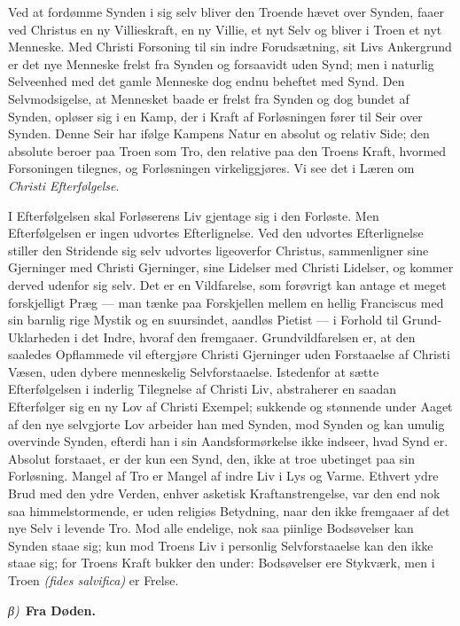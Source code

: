 \documentclass[12pt]{book}
\newcommand{\greekrun}[2]{%
  \medskip\begin{center}{\itshape #1)}\ {\bfseries #2}\end{center}\medskip}
\begin{document}
Ved at fordømme Synden i sig selv bliver den Troende hævet over
Synden, faaer ved Christus en ny Villieskraft, en ny Villie, et nyt
Selv og bliver i Troen et nyt Menneske. Med Christi Forsoning til
sin indre Forudsætning, sit Livs Ankergrund er det nye Menneske
frelst fra Synden og forsaavidt uden Synd; men i naturlig
Selveenhed med det gamle Menneske dog endnu beheftet med Synd. Den
Selvmodsigelse, at Mennesket baade er frelst fra Synden og dog
bundet af Synden, opløser sig i en Kamp, der i Kraft af
Forløsningen fører til Seir over Synden. Denne Seir har ifølge
Kampens Natur en absolut og relativ Side; den absolute beroer paa
Troen som Tro, den relative paa den Troens Kraft, hvormed
Forsoningen tilegnes, og Forløsningen virkeliggjøres. Vi see det i
Læren om \emph{Christi Efterfølgelse}.

I Efterfølgelsen skal Forløserens Liv gjentage sig i den Forløste.
Men Efterfølgelsen er ingen udvortes Efterlignelse. Ved den udvortes
Efterlignelse stiller den Stridende sig selv udvortes ligeoverfor
Christus, sammenligner sine Gjerninger med Christi Gjerninger, sine
Lidelser med Christi Lidelser, og kommer derved udenfor sig selv.
Det er en Vildfarelse, som forøvrigt kan antage et meget
forskjelligt Præg --- man tænke paa Forskjellen mellem en hellig
Franciscus med sin barnlig rige Mystik og en suursindet, aandløs
Pietist --- i Forhold til Grund-Uklarheden i det Indre, hvoraf den
fremgaaer. Grundvildfarelsen er, at den saaledes Opflammede vil
eftergjøre Christi Gjerninger uden Forstaaelse af Christi Væsen,
uden dybere menneskelig Selvforstaaelse. Istedenfor at sætte
Efterfølgelsen i inderlig Tilegnelse af Christi Liv, abstraherer en
saadan Efterfølger sig en ny Lov af Christi
Exempel; sukkende og stønnende under Aaget af den nye selvgjorte Lov
arbeider han med Synden, mod Synden og kan umulig overvinde Synden,
efterdi han i sin Aandsformørkelse ikke indseer, hvad Synd er.
Absolut forstaaet, er der kun een Synd, den, ikke at troe ubetinget
paa sin Forløsning. Mangel af Tro er Mangel af indre Liv i Lys og
Varme. Ethvert ydre Brud med den ydre Verden, enhver asketisk
Kraftanstrengelse, var den end nok saa himmelstormende, er uden
religiøs Betydning, naar den ikke fremgaaer af det nye Selv i
levende Tro. Mod alle endelige, nok saa piinlige Bodsøvelser kan
Synden staae sig; kun mod Troens Liv i personlig Selvforstaaelse kan
den ikke staae sig; for Troens Kraft bukker den under: Bodsøvelser
ere Stykværk, men i Troen \textit{(fides salvifica)} er Frelse.

\greekrun{β}{Fra Døden.}
\end{document}
